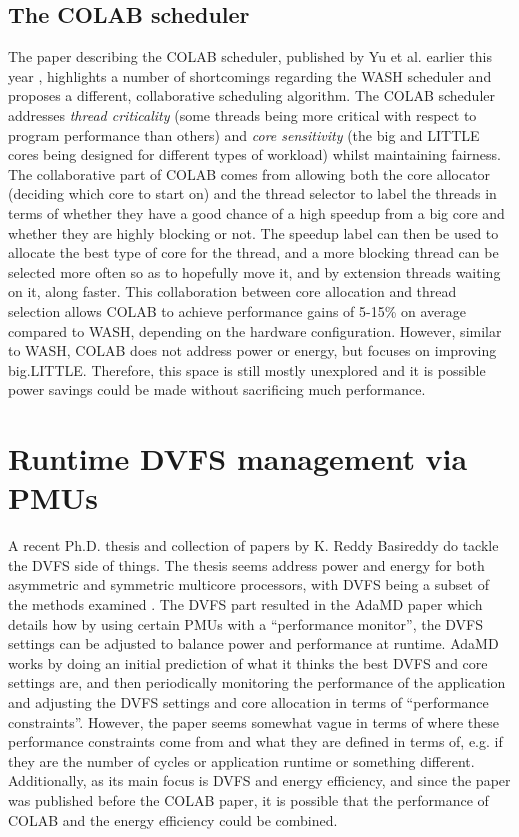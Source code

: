     \subsection{The COLAB scheduler}
    The paper describing the COLAB scheduler, published by Yu et al. earlier 
    this year \cite{yu_colab_2020}, highlights a number of shortcomings 
    regarding the WASH scheduler and proposes a different, collaborative 
    scheduling algorithm. The COLAB scheduler addresses \textit{thread 
    criticality} (some threads being more critical with respect to program 
    performance than others) and \textit{core sensitivity} (the big and LITTLE 
    cores being designed for different types of workload) whilst maintaining 
    fairness. The collaborative part of COLAB comes from allowing both the core 
    allocator (deciding which core to start on) and the thread selector to 
    label the threads in terms of whether they have a good chance of a high 
    speedup from a big core and whether they are highly blocking or not. The 
    speedup label can then be used to allocate the best type of core for the 
    thread, and a more blocking thread can be selected more often so as to 
    hopefully move it, and by extension threads waiting on it, along faster. 
    This collaboration between core allocation and thread selection allows 
    COLAB to achieve performance gains of 5-15\% on average compared to WASH, 
    depending on the hardware configuration. However, similar to WASH, COLAB 
    does not address power or energy, but focuses on improving big.LITTLE. 
    Therefore, this space is still mostly unexplored and it is possible power 
    savings could be made without sacrificing much performance.

\section{Runtime DVFS management via PMUs}
A recent Ph.D. thesis and collection of papers by K. Reddy Basireddy do tackle
the DVFS side of things. The thesis seems address power and energy for both
asymmetric and symmetric multicore processors, with DVFS being a subset of the
methods examined \cite{basireddy_runtime_2019}. The DVFS part resulted in the
AdaMD paper \cite{basireddy_adamd_2019} which details how by using certain PMUs
with a ``performance monitor'', the DVFS settings can be adjusted to balance
power and performance at runtime. AdaMD works by doing an initial prediction of
what it thinks the best DVFS and core settings are, and then periodically
monitoring the performance of the application and adjusting the DVFS settings
and core allocation in terms of ``performance constraints''. However, the paper
seems somewhat vague in terms of where these performance constraints come from
and what they are defined in terms of, e.g. if they are the number of cycles or
application runtime or something different. Additionally, as its main focus is
DVFS and energy efficiency, and since the paper was published before the COLAB
paper, it is possible that the performance of COLAB and the energy efficiency
could be combined.

